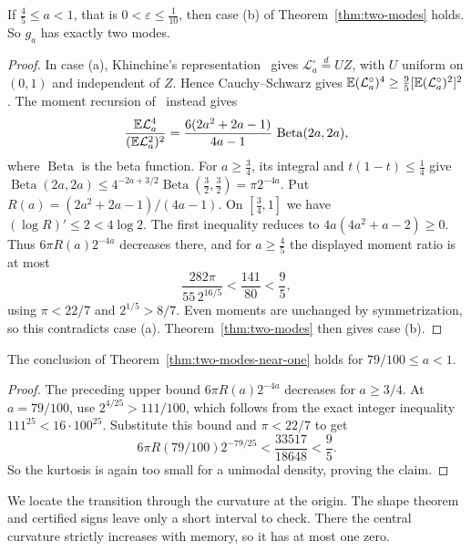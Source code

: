 \begin{theorem}\label{thm:two-modes-near-one}
If $\frac45\le a<1$, that is $0<\varepsilon\le\frac1{10}$, then case (b)
of Theorem~\ref{thm:two-modes} holds. So $g_a$ has exactly two modes.
\end{theorem}

\begin{proof}
In case (a), Khinchine's representation~\cite{dj1988} gives
$\mathcal L^\circ_a\overset{d}=UZ$, with $U$ uniform on $(0,1)$ and
independent of $Z$. Hence Cauchy--Schwarz gives
$\mathbb{E}(\mathcal L^\circ_a)^4\ge\frac95[\mathbb{E}(\mathcal L^\circ_a)^2]^2$.
The moment recursion of~\cite[Theorem~1.4]{glr2026} instead gives
\[
 \frac{\mathbb{E}\mathcal L_a^4}{(\mathbb{E}\mathcal L_a^2)^2}
 =\frac{6(2a^2+2a-1)}{4a-1}\,\operatorname{Beta}(2a,2a),
\]
where $\operatorname{Beta}$ is the beta function. For $a\ge\frac34$, its integral and
$t(1-t)\le\frac14$ give
$\operatorname{Beta}(2a,2a)\le4^{-2a+3/2}\operatorname{Beta}(\frac32,\frac32)=\pi2^{-4a}$.
Put $R(a)=(2a^2+2a-1)/(4a-1)$. On $[\frac34,1]$ we have
$(\log R)'\le2<4\log2$. The first inequality reduces to
$4a(4a^2+a-2)\ge0$. Thus $6\pi R(a)2^{-4a}$ decreases there, and for
$a\ge\frac45$ the displayed moment ratio is at most
\[
 \frac{282\pi}{55\,2^{16/5}}
 <\frac{141}{80}<\frac95,
\]
using $\pi<22/7$ and $2^{1/5}>8/7$. Even moments are unchanged by
symmetrization, so this contradicts case (a). Theorem~\ref{thm:two-modes}
then gives case (b).
\end{proof}

\begin{corollary}\label{cor:analytic-range}
The conclusion of Theorem~\ref{thm:two-modes-near-one} holds for
$79/100\le a<1$.
\end{corollary}

\begin{proof}
The preceding upper bound $6\pi R(a)2^{-4a}$ decreases for $a\ge3/4$.
At $a=79/100$, use $2^{4/25}>111/100$, which follows from the exact
integer inequality $111^{25}<16\cdot100^{25}$. Substitute this bound
and $\pi<22/7$ to get
\[
 6\pi R(79/100)2^{-79/25}
 <\frac{33517}{18648}<\frac95.
\]
So the kurtosis is again too small for a unimodal density, proving
the claim.
\end{proof}

We locate the transition through the curvature at the origin.
The shape theorem and certified signs leave only a short interval to
check. There the central curvature strictly increases with memory,
so it has at most one zero.

